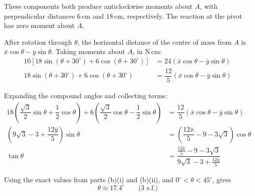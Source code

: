 \documentclass[leqno]{article}
\begin{document}
\begin{enumerate}[
  label=\textbf{\arabic*.},
  leftmargin=*,
  topsep=0pt,
  partopsep=0pt,
  parsep=0pt
]
\begin{djsSolution}
\begin{enumerate}[label=\textbf{(\alph*)}, start=1]
These components both produce anticlockwise moments about \(A\), with perpendicular distances \(6\,\mathrm{cm}\) and \(18\,\mathrm{cm}\), respectively. The reaction at the pivot has zero moment about \(A\).

After rotation through \(\theta\), the horizontal distance of the centre of mass from \(A\) is \(\bar{x}\cos\theta-\bar{y}\sin\theta\). Taking moments about \(A\), in \(\mathrm{N\,cm}\):
\begin{align*}
10\left[18\sin(\theta+30^\circ)+6\cos(\theta+30^\circ)\right]
&=24(\bar{x}\cos\theta-\bar{y}\sin\theta)\\
18\sin(\theta+30^\circ)+6\cos(\theta+30^\circ)
&=\dfrac{12}{5}(\bar{x}\cos\theta-\bar{y}\sin\theta)
\end{align*}

Expanding the compound angles and collecting terms:
\begin{align*}
18\left(\dfrac{\sqrt3}{2}\sin\theta+\dfrac12\cos\theta\right)
+6\left(\dfrac{\sqrt3}{2}\cos\theta-\dfrac12\sin\theta\right)
&=\dfrac{12}{5}(\bar{x}\cos\theta-\bar{y}\sin\theta)\\
\left(9\sqrt3-3+\dfrac{12\bar{y}}{5}\right)\sin\theta
&=\left(\dfrac{12\bar{x}}{5}-9-3\sqrt3\right)\cos\theta\\
\tan\theta&=\dfrac{\frac{12\bar{x}}{5}-9-3\sqrt3}{9\sqrt3-3+\frac{12\bar{y}}{5}}
\end{align*}

Using the exact values from parts (b)(i) and (b)(ii), and \(0^\circ<\theta<45^\circ\), gives
\[
\theta\approx17.4^\circ\qquad\text{(3 s.f.)}
\]

\end{enumerate}
\end{djsSolution}

\end{enumerate}
\end{document}
